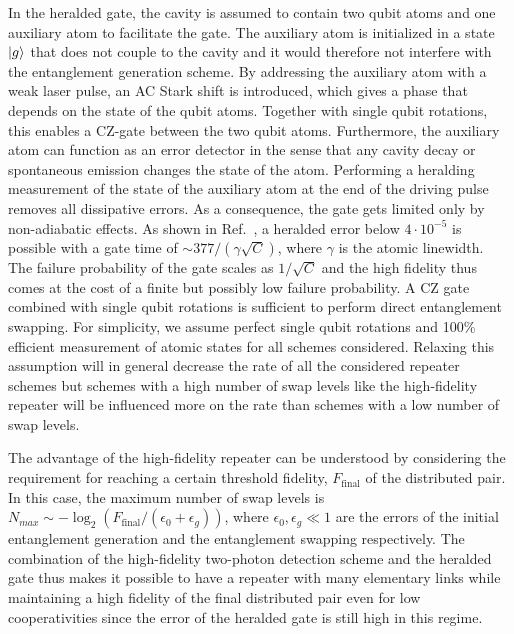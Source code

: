 In the heralded gate, the cavity is assumed to contain two qubit atoms and one
auxiliary atom to facilitate the gate. The auxiliary atom is initialized in a
state $| g \rangle$ that does not couple to the cavity and it would therefore not
interfere with the entanglement generation scheme. By addressing the auxiliary
atom with a weak laser pulse, an AC Stark shift is introduced, which gives a
phase that depends on the state of the qubit atoms. Together with single qubit
rotations, this enables a CZ-gate between the two qubit atoms. Furthermore, the
auxiliary atom can function as an error detector in the sense that any cavity
decay or spontaneous emission changes the state of the atom. Performing a
heralding measurement of the state of the auxiliary atom at the end of the
driving pulse removes all dissipative errors. As a consequence, the gate gets
limited only by non-adiabatic effects. As shown in Ref.~\cite{johannes}, a
heralded error below $4\cdot10^{-5}$ is possible with a gate time of
$\sim377/(\gamma\sqrt{C})$, where $\gamma$ is the atomic linewidth. The failure
probability of the gate scales as $1/\sqrt{C}$ and the high fidelity thus comes
at the cost of a finite but possibly low failure probability. A CZ gate combined
with single qubit rotations is sufficient to perform direct entanglement
swapping. For simplicity, we assume perfect single qubit rotations and 100\%
efficient measurement of atomic states for all schemes considered. Relaxing this
assumption will in general decrease the rate of all the considered repeater
schemes but schemes with a high number of swap levels like the high-fidelity
repeater will be influenced more on the rate than schemes with a low number of
swap levels.

The advantage of the high-fidelity repeater can be understood by considering the
requirement for reaching a certain threshold fidelity, $F_{\text{final}}$ of the
distributed pair. In this case, the maximum number of swap levels is
$N_{max}\sim -\log_{2}(F_{\text{final}}/(\epsilon_{0}+\epsilon_{g}))$, where
$\epsilon_{0},\epsilon_{g}\ll1$ are the errors of the initial entanglement
generation and the entanglement swapping respectively. The combination of the
high-fidelity two-photon detection scheme and the heralded gate thus makes it
possible to have a repeater with many elementary links while maintaining a high
fidelity of the final distributed pair even for low cooperativities since the
error of the heralded gate is still high in this regime.

